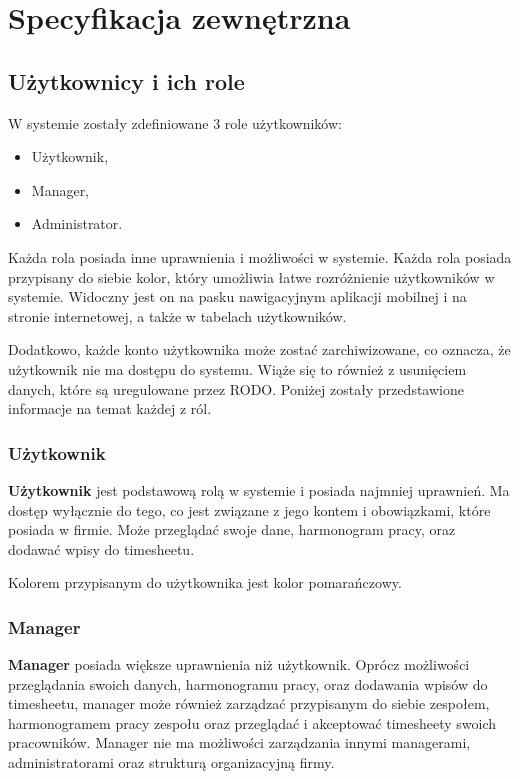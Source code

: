 \chapter{Specyfikacja zewnętrzna}
\label{ch:04}

\section{Użytkownicy i ich role}

W systemie zostały zdefiniowane 3 role użytkowników:

\begin{itemize}
    \item Użytkownik,
    \item Manager,
    \item Administrator.
\end{itemize}

Każda rola posiada inne uprawnienia i możliwości w systemie. Każda rola posiada przypisany do siebie kolor, który
umożliwia łatwe rozróżnienie użytkowników w systemie. Widoczny jest on na pasku nawigacyjnym aplikacji mobilnej i na stronie internetowej, a także w tabelach użytkowników.

Dodatkowo, każde konto użytkownika może zostać zarchiwizowane, co oznacza, że użytkownik nie ma dostępu do systemu. Wiąże się to również z usunięciem danych, które są uregulowane przez RODO. Poniżej zostały przedstawione informacje na temat każdej z ról.


\subsection{Użytkownik}

\textbf{Użytkownik} jest podstawową rolą w systemie i posiada najmniej uprawnień. Ma dostęp wyłącznie do tego, co jest związane z jego kontem i obowiązkami, które posiada w firmie. Może przeglądać swoje dane, harmonogram pracy, oraz dodawać wpisy do timesheetu.

Kolorem przypisanym do użytkownika jest kolor pomarańczowy.

\subsection{Manager}

\textbf{Manager} posiada większe uprawnienia niż użytkownik. Oprócz możliwości przeglądania swoich danych, harmonogramu pracy, oraz dodawania wpisów do timesheetu, manager może również zarządzać przypisanym do siebie zespołem, harmonogramem pracy zespołu oraz przeglądać i akceptować timesheety swoich pracowników. Manager nie ma możliwości zarządzania innymi managerami, administratorami oraz strukturą organizacyjną firmy.

